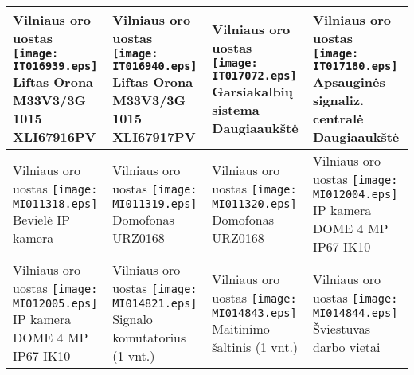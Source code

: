 \documentclass[a4paper,12pt]{article}
\begin{document}
\begin{supertabular}{|p{4.2cm}|p{4.2cm}|p{4.2cm}|p{4.2cm}|}
Vilniaus oro uostas \newline \texttt{[image: IT016939.eps]} \newline Liftas \newline \footnotesize {Orona M33V3/3G 1015
XLI67916PV
} & Vilniaus oro uostas \newline \texttt{[image: IT016940.eps]} \newline Liftas \newline \footnotesize {Orona M33V3/3G 1015
XLI67917PV
} & Vilniaus oro uostas \newline \texttt{[image: IT017072.eps]} \newline Garsiakalbių sistema \newline \footnotesize {Daugiaaukštė} & Vilniaus oro uostas \newline \texttt{[image: IT017180.eps]} \newline Apsauginės signaliz. centralė \newline \footnotesize {Daugiaaukštė}\\\hline
Vilniaus oro uostas \newline \texttt{[image: MI011318.eps]} \newline Bevielė IP kamera \newline \footnotesize {} & Vilniaus oro uostas \newline \texttt{[image: MI011319.eps]} \newline Domofonas URZ0168 \newline \footnotesize {} & Vilniaus oro uostas \newline \texttt{[image: MI011320.eps]} \newline Domofonas URZ0168 \newline \footnotesize {} & Vilniaus oro uostas \newline \texttt{[image: MI012004.eps]} \newline IP kamera DOME 4 MP IP67 IK10 \newline \footnotesize {}\\\hline
Vilniaus oro uostas \newline \texttt{[image: MI012005.eps]} \newline IP kamera DOME 4 MP IP67 IK10 \newline \footnotesize {} & Vilniaus oro uostas \newline \texttt{[image: MI014821.eps]} \newline Signalo komutatorius (1 vnt.) \newline \footnotesize {} & Vilniaus oro uostas \newline \texttt{[image: MI014843.eps]} \newline Maitinimo šaltinis (1 vnt.) \newline \footnotesize {} & Vilniaus oro uostas \newline \texttt{[image: MI014844.eps]} \newline Šviestuvas darbo vietai \newline \footnotesize {}\\\hline

\end{supertabular}
\end{document}
